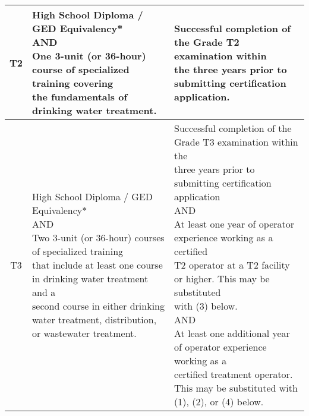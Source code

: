 \begin{table}[H]
\begin{tabular}{|c|p{7.1cm}|p{7cm}|}
T2    & \makecell[l]{High School Diploma / GED Equivalency*\\AND\\One 3-unit (or 36-hour) course of specialized training covering\\the fundamentals of drinking water treatment.} & \makecell[l]{Successful completion of the Grade T2 examination within\\the three years prior to submitting certification application.                                                                                                                                                                                                                                                                                                                                                                                                           } \\
\hline
T3    & \makecell[l]{High School Diploma / GED Equivalency*\\AND\\Two 3-unit (or 36-hour) courses of specialized training\\that include at least one course in drinking water treatment and a \\second course in either drinking water treatment, distribution,\\or wastewater treatment.}& \makecell[l]{Successful completion of the Grade T3 examination within the\\three years prior to   submitting certification application\\AND\\At least one year of operator experience working as a   certified\\T2 operator at a T2 facility or higher. This may be substituted\\with (3) below.\\AND\\      At least one additional year of operator experience working as a\\certified treatment operator. This may be substituted with\\(1), (2), or (4) below.}\\  
\hline                               

\end{tabular}
\end{table}
